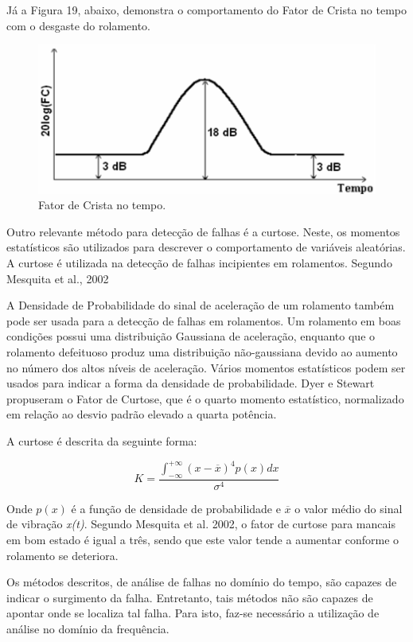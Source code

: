 \documentclass[
	12pt,				
	oneside,			
	a4paper,			
	english,			
	brazil				
	]{abntex2ppgsi}
\begin{document}
Já a Figura 19, abaixo, demonstra o comportamento do Fator de Crista no tempo com o desgaste do rolamento.

\begin{figure}[!htb]
\centering
\includegraphics{Figura19}
\caption {Fator de Crista no tempo.}
\label{Figura19}
\end{figure}	

Outro relevante método para detecção de falhas é a curtose. Neste, os momentos estatísticos são utilizados para descrever o comportamento de variáveis aleatórias. A curtose é utilizada na detecção de falhas incipientes em rolamentos. Segundo Mesquita et al., 2002

\begin{citacao}
A Densidade de Probabilidade do sinal de aceleração de um rolamento também pode ser usada para a detecção de falhas em rolamentos. Um rolamento em boas condições possui uma distribuição Gaussiana de aceleração, enquanto que o rolamento defeituoso produz uma distribuição não-gaussiana devido ao aumento no número dos altos níveis de aceleração.
Vários momentos estatísticos podem ser usados para indicar a forma da densidade de probabilidade. Dyer e Stewart propuseram o Fator de Curtose, que é o quarto momento estatístico, normalizado em relação ao desvio padrão elevado a quarta potência.
\end{citacao}

A curtose é descrita da seguinte forma:

\[K = \frac{ \int_{-\infty}^{+\infty} (x - \overline{x})^{4}p(x)dx } {\sigma^{4}} \]

Onde $p(x)$ é a função de densidade de probabilidade e $\overline{x}$ o valor médio do sinal de vibração \textit{x(t)}. Segundo Mesquita et al. 2002, o fator de curtose para mancais em bom estado é igual a três, sendo que este valor tende a aumentar conforme o rolamento se deteriora. 

Os métodos descritos, de análise de falhas no domínio do tempo, são capazes de indicar o surgimento da falha. Entretanto, tais métodos não são capazes de apontar onde se localiza tal falha. Para isto, faz-se necessário a utilização de análise no domínio da frequência. 
\end{document}
